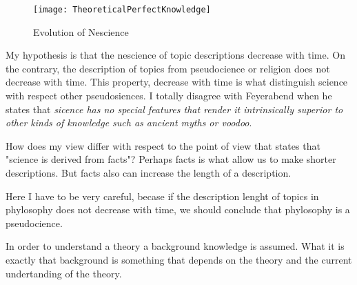 \begin{figure}[h]
\centering\texttt{[image: TheoreticalPerfectKnowledge]}
\caption{\label{fig:TheoreticalPerfectKnowledge}Evolution of Nescience}
\end{figure}

My hypothesis is that the nescience of topic descriptions decrease with time. On the contrary, the description of topics from pseudocience or religion does not decrease with time. This property, decrease with time is what distinguish science with respect other pseudosiences. I totally disagree with Feyerabend when he states that \emph{sicence has no special features that render it intrinsically superior to other kinds of knowledge such as ancient myths or voodoo}.

How does my view differ with respect to the point of view that states that "science is derived from facts"? Perhaps facts is what allow us to make shorter descriptions. But facts also can increase the length of a description.

Here I have to be very careful, becase if the description lenght of topics in phylosophy does not decrease with time, we should conclude that phylosophy is a pseudocience.

In order to understand a theory a background knowledge is assumed. What it is exactly that background is something that depends on the theory and the current undertanding of the theory.

